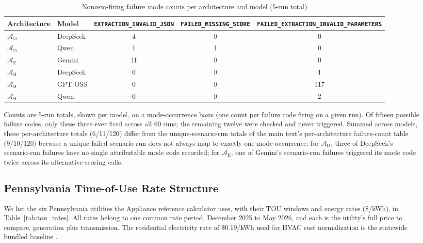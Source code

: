 \documentclass[11pt]{article}
\begin{document}
\begin{table}[htbp]
\small\centering
\caption{Nonzero-firing failure mode counts per architecture and model (5-run total)}
\label{tab:failure_modes}
\begin{tabular}{llccc}
\toprule
Architecture & Model & \texttt{EXTRACTION\_INVALID\_JSON} & \texttt{FAILED\_MISSING\_SCORE} & \texttt{FAILED\_EXTRACTION\_INVALID\_PARAMETERS} \\
\midrule
$\mathcal{A}_{\text{D}}$ & DeepSeek & 4 & 0 & 0 \\
$\mathcal{A}_{\text{D}}$ & Qwen & 1 & 1 & 0 \\
$\mathcal{A}_{\text{E}}$ & Gemini & 11 & 0 & 0 \\
$\mathcal{A}_{\text{H}}$ & DeepSeek & 0 & 0 & 1 \\
$\mathcal{A}_{\text{H}}$ & GPT-OSS & 0 & 0 & 117 \\
$\mathcal{A}_{\text{H}}$ & Qwen & 0 & 0 & 2 \\
\bottomrule
\end{tabular}
\end{table}


Counts are 5-run totals, shown per model, on a mode-occurrence basis (one count per failure code firing on a given run). Of fifteen possible failure codes, only these three ever fired across all 60 runs; the remaining twelve were checked and never triggered. Summed across models, these per-architecture totals (6/11/120) differ from the unique-scenario-run totals of the main text's per-architecture failure-count table (9/10/120) because a unique failed scenario-run does not always map to exactly one mode-occurrence: for $\mathcal{A}_{\text{D}}$, three of DeepSeek's scenario-run failures have no single attributable mode code recorded; for $\mathcal{A}_{\text{E}}$, one of Gemini's scenario-run failures triggered its mode code twice across its alternative-scoring calls.

\subsection{Pennsylvania Time-of-Use Rate Structure}
\label{app:tou_rates}

We list the six Pennsylvania utilities the Appliance reference calculator uses,
with their TOU windows and energy rates (\$/kWh), in
Table~\ref{tab:tou_rates}. All rates belong to one common rate period, December 2025 to May 2026, and each is the utility's full price to compare, generation plus transmission. The residential electricity rate of \$0.19/kWh used for HVAC cost normalization is the
statewide bundled baseline \citep{eia_epa_2024,paupc2025}.
\end{document}
